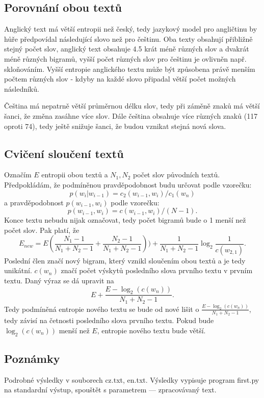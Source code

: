 \documentclass[12pt, a4paper]{report}
\theoremstyle{remark}
\begin{document}
\

\




\

\

\







\subsection*{Porovnání obou textů}
Anglický text má větší entropii než český, tedy jazykový model pro angličtinu by hůře předpovídal následující slovo než pro češtinu. Oba texty obsahují přibližně stejný počet slov, anglický text obsahuje 4.5 krát méně různých slov a dvakrát méně různých bigramů, vyšší počet různých slov pro češtinu je ovlivněn např. skloňováním. Vyšší entropie anglického textu může být způsobena právě menším počtem různých slov - kdyby na každé slovo připadal větší počet možných následníků. 

Čeština má nepatrně větší průměrnou délku slov, tedy při záměně znaků má větší šanci, že změna zasáhne více slov. Dále čeština obsahuje více různých znaků (117 oproti 74), tedy ještě snižuje šanci, že budou vznikat stejná nová slova.

\subsection*{Cvičení sloučení textů}
Označím $E$ entropii obou textů a $N_1,N_2$ počet slov původních textů. Předpokládám, že podmíněnou pravděpodobnost budu určovat podle vzorečku: $$p(w_i|w_{i-1})=c_2(w_{i-1},w_i)/c_1(w_{n})$$ a pravděpodobnost $p(w_{i-1},w_{i})$ podle vzorečku: $$p(w_{i-1},w_{i})=c(w_{i-1},w_{i})/(N-1).$$ Konce textu nebudu nijak označovat, tedy počet bigramů bude o 1 menší než počet slov. Pak platí, že 
$$ E_{new}= E(\frac{N_1-1}{N_1+N_2-1}+\frac{N_2-1}{N_1+N_2-1}))+\frac{1}{N_1+N_2-1}\log_2{\frac{1}{c(w_{2,1})}}. $$
Poslední člen značí nový bigram, který vznikl sloučením obou textů a je tedy unikátní. $c(w_n)$ značí počet výskytů posledního slova prvního textu v prvním textu. Daný výraz se dá upravit na
$$ E+\frac{E-\log_2(c(w_{n}))}{N_1+N_2-1}. $$
Tedy podmíněná entropie nového textu se bude od nové lišit o $\frac{E-\log_2(c(w_{n}))}{N_1+N_2-1}$, tedy závisí na četnosti posledního slova prvního textu. Pokud bude $\log_2(c(w_{n}))$ menší než $E$, entropie nového textu bude větší.

\subsection*{Poznámky}
Podrobné výsledky v souborech cz.txt, en.txt.
Výsledky vypisuje program first.py na standardní výstup, spouštět s parametrem --- zpracovávaný text.
\end{document}
